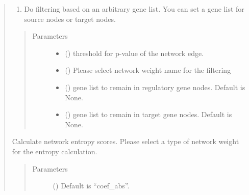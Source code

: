 \documentclass[letterpaper,10pt,english]{sphinxmanual}
\begin{document}
\begin{quote}
\begin{fulllineitems}
\begin{fulllineitems}
\begin{enumerate}
\item {} 
Do filtering based on an arbitrary gene list. You can set a gene list for source nodes or target nodes.

\end{enumerate}
\begin{quote}\begin{description}
\item[{Parameters}] \leavevmode\begin{itemize}
\item {} 
 () \textendash{} threshold for p-value of the network edge.

\item {} 
 () \textendash{} Please select network weight name for the filtering

\item {} 
 () \textendash{} gene list to remain in regulatory gene nodes. Default is None.

\item {} 
 () \textendash{} gene list to remain in target gene nodes. Default is None.

\end{itemize}

\end{description}\end{quote}

\end{fulllineitems}


\begin{fulllineitems}
\label{\detokenize{modules/celloracle.network_analysis:celloracle.network_analysis.Links.get_network_entropy}}
Calculate network entropy scores.
Please select a type of network weight for the entropy calculation.
\begin{quote}\begin{description}
\item[{Parameters}] \leavevmode
{} () \textendash{} Default is “coef\_abs”.


\end{description}
\end{quote}
\end{fulllineitems}
\end{fulllineitems}
\end{quote}
\end{document}
